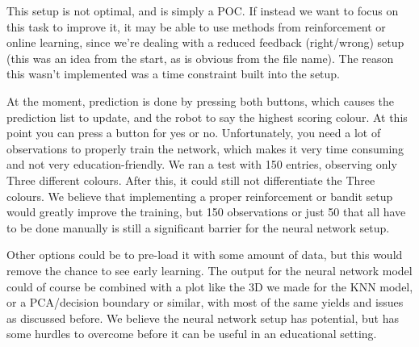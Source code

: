 \documentclass[11pt, a4paper]{article}
\begin{document}
	This setup is not optimal, and is simply a POC. If instead we want to focus on this task to improve it, it may be able to use methods from reinforcement or online learning, since we're dealing with a reduced feedback (right/wrong) setup (this was an idea from the start, as is obvious from the file name). The reason this wasn't implemented was a time constraint built into the setup. 
	\medskip
	
	At the moment, prediction is done by pressing both buttons, which causes the prediction list to update, and the robot to say the highest scoring colour. At this point you can press a button for yes or no. Unfortunately, you need a lot of observations to properly train the network, which makes it very time consuming and not very education-friendly. We ran a test with 150 entries, observing only Three different colours. After this, it could still not differentiate the Three colours. We believe that implementing a proper reinforcement or bandit setup would greatly improve the training, but 150 observations or just 50 that all have to be done manually is still a significant barrier for the neural network setup. 
	
	Other options could be to pre-load it with some amount of data, but this would remove the chance to see early learning. The output for the neural network model could of course be combined with a plot like the 3D we made for the KNN model, or a PCA/decision boundary or similar, with most of the same yields and issues as discussed before. We believe the neural network setup has potential, but has some hurdles to overcome before it can be useful in an educational setting.
	
	\pagebreak
\end{document}

